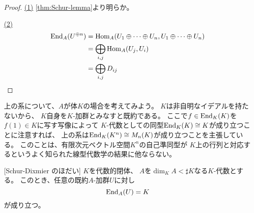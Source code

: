 \documentclass[report]{jlreq}
\begin{document}

\begin{proof}
    \uline{(1)} \quad
    \cref{thm:Schur-lemma}より明らか。

    \uline{(2)} \quad
    \begin{alignat}{1}
        \operatorname{End}_A(U^{\oplus n})
            &= \operatorname{Hom}_A(U_1 \oplus \cdots \oplus U_n, U_1 \oplus \cdots \oplus U_n) \\
            &= \bigoplus_{i, j} \operatorname{Hom}_A(U_j, U_i) \\
            &= \bigoplus_{i, j} D_{ij}
    \end{alignat}
    \TODO{}
\end{proof}

\begin{example}
    上の系について、$A$が体$K$の場合を考えてみよう。
    $K$は非自明なイデアルを持たないから、
    $K$自身を$K$-加群とみなすと既約である。
    ここで$f \in \operatorname{End}_K(K)$を$f(1) \in K$に写す写像によって
    $K$-代数としての同型$\operatorname{End}_K(K) \cong K$が成り立つことに注意すれば、
    上の系は$\operatorname{End}_K(K^n) \cong M_n(K)$が成り立つことを主張している。
    このことは、有限次元ベクトル空間$K^n$の自己準同型が
    $K$上の行列と対応するというよく知られた線型代数学の結果に他ならない。
\end{example}

\begin{corollary}
    [Schur-Dixmier のほだい]
    $K$を代数的閉体、
    $A$を$\dim_K A < \sharp K$なる$K$-代数とする。
    このとき、任意の既約$A$-加群$U$に対し
    \begin{equation}
        \operatorname{End}_A(U) = K
    \end{equation}
    が成り立つ。
\end{corollary}
\end{document}
